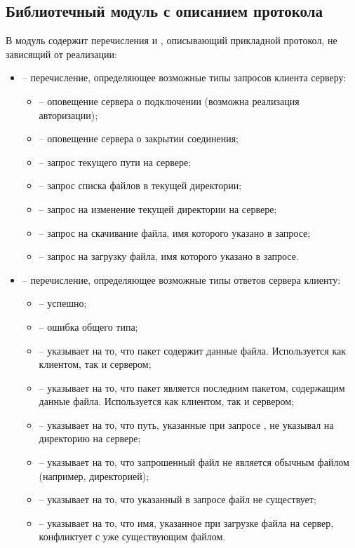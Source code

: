 \subsection{Библиотечный модуль с описанием протокола}

В модуль  содержит перечисления  и , описывающий прикладной протокол, не зависящий от реализации:
\begin{itemize}
	\item {} -- перечисление, определяющее возможные типы запросов клиента серверу:
	\begin{itemize}
		\item {} -- оповещение сервера о подключении (возможна реализация авторизации);
		\item {} -- оповещение сервера о закрытии соединения;
		\item {} -- запрос текущего пути на сервере;
		\item {} -- запрос списка файлов в текущей директории;
		\item {} -- запрос на изменение текущей директории на сервере;
		\item {} -- запрос на скачивание файла, имя которого указано в запросе;
		\item {} -- запрос на загрузку файла, имя которого указано в запросе.
	\end{itemize}
	\item {} -- перечисление, определяющее возможные типы ответов сервера клиенту:
	\begin{itemize}
		\item {} -- успешно;
		\item {} -- ошибка общего типа;
		\item {} -- указывает на то, что пакет содержит данные файла. Используется как клиентом, так и сервером;
		\item {} -- указывает на то, что пакет является последним пакетом, содержащим данные файла. Используется как клиентом, так и сервером;
		\item {} -- указывает на то, что путь, указанные при запросе , не указывал на директорию на сервере;
		\item {} -- указывает на то, что запрошенный файл не является обычным файлом (например, директорией);
		\item {} -- указывает на то, что указанный в запросе файл не существует;
		\item {} -- указывает на то, что имя, указанное при загрузке файла на сервер, конфликтует с уже существующим файлом.
	\end{itemize}
\end{itemize}

